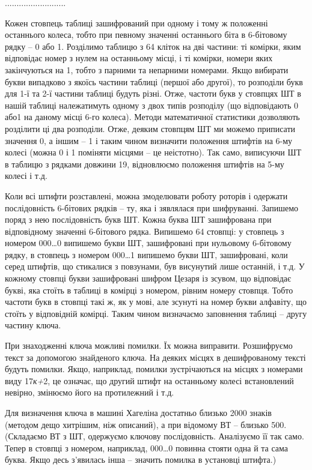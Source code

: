 \documentclass[a4paper]{article}
\newcounter{}
\begin{document}
{\centering
..........................
\par}

Кожен стовпець таблиці зашифрований при одному і тому ж положенні останнього
колеса, тобто при певному значенні останнього біта в 6-бітовому рядку – 0 або
1. Розділимо таблицю з 64 кліток на дві частини: ті комірки, яким відповідає
номер з нулем на останньому місці, і ті комірки, номери яких закінчуються на 1,
тобто з парними та непарними номерами. Якщо вибирати букви випадково з якоїсь
частини таблиці (першої або другої), то розподіли букв для 1-ї та 2-ї частини
таблиці будуть різні. Отже, частоти букв у стовпцях ШТ в нашій таблиці
належатимуть одному з двох типів розподілу (що відповідають 0 або1 на даному
місці 6-го колеса). Методи математичної статистики дозволяють розділити ці два
розподіли. Отже, деяким стовпцям ШТ ми можемо приписати значення 0, а іншим – 1
і таким чином визначити положення штифтів на 6-му колесі (можна 0 і 1 поміняти
місцями – це неістотно). Так само, виписуючи ШТ в таблицю з рядками довжини 19,
відновлюємо положення штифтів на 5-му колесі і т.д.

Коли всі штифти розставлені, можна змоделювати роботу роторів і одержати
послідовність 6-бітових рядків – ту, яка і з{\textquotesingle}являлася при
шифруванні. Запишемо поряд з нею послідовність букв ШТ. Кожна буква ШТ
зашифрована при відповідному значенні 6-бітового рядка. Випишемо 64 стовпці: у
стовпець з номером 000…0 випишемо букви ШТ, зашифровані при нульовому
6-бітовому рядку, в стовпець з номером 000…1 випишемо букви ШТ, зашифровані,
коли серед штифтів, що стикалися з повзунами, був висунутий лише останній, і
т.д. У кожному стовпці букви зашифровані шифром Цезаря із зсувом, що відповідає
букві, яка стоїть в таблиці  в комірці з номером, рівним номеру стовпця. Тобто
частоти букв в стовпці такі ж, як у мові, але зсунуті на номер букви алфавіту,
що стоїть у відповідній комірці. Таким чином визначаємо заповнення таблиці –
другу частину ключа.

При знаходженні ключа можливі помилки. Їх можна виправити. Розшифруємо текст за
допомогою знайденого ключа. На деяких місцях в дешифрованому тексті будуть
помилки. Якщо, наприклад, помилки зустрічаються на місцях з номерами виду 
17\textit{к+}2, це означає, що другий штифт на останньому колесі встановлений
невірно, змінюємо його на протилежний і т.д.

Для визначення ключа в машині Хагеліна достатньо близько 2000 знаків (методом
дещо хитрішим, ніж описаний), а при відомому ВТ – близько 500. (Складаємо ВТ з
ШТ, одержуємо ключову послідовність. Аналізуємо її так само. Тепер в стовпці з
номером, наприклад, 000…0 повинна стояти одна й та сама буква. Якщо десь
з’явилась інша – значить помилка в установці штифта.)
\end{document}
